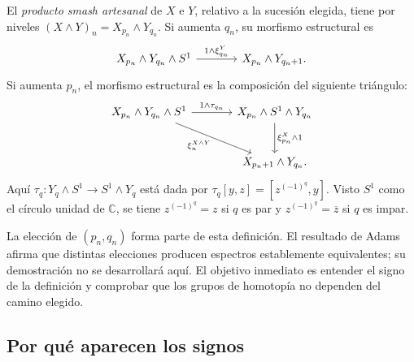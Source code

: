 \begin{defi}\label{defi:c10-smash-artesanal}
El \emph{producto smash artesanal} de $X$ e $Y$, relativo a la sucesión elegida, tiene por niveles $(X\wedge Y)_n=X_{p_n}\wedge Y_{q_n}$. Si aumenta $q_n$, su morfismo estructural es
\[
\begin{tikzcd}[column sep=large]
X_{p_n}\wedge Y_{q_n}\wedge S^1
\arrow[r,"1\wedge\xi^Y_{q_n}"] & X_{p_n}\wedge Y_{q_n+1}.
\end{tikzcd}
\]
Si aumenta $p_n$, el morfismo estructural es la composición del siguiente triángulo:
\[
\begin{tikzcd}[column sep=large,row sep=large]
X_{p_n}\wedge Y_{q_n}\wedge S^1
\arrow[r,"1\wedge\tau_{q_n}"] \arrow[dr,swap,"\xi^{X\wedge Y}_n"]
& X_{p_n}\wedge S^1\wedge Y_{q_n}
\arrow[d,"\xi^X_{p_n}\wedge1"]\\
& X_{p_n+1}\wedge Y_{q_n}.
\end{tikzcd}
\]
Aquí $\tau_q\colon Y_q\wedge S^1\to S^1\wedge Y_q$ está dada por $\tau_q[y,z]=[z^{(-1)^q},y]$. Visto $S^1$ como el círculo unidad de $\mathbb C$, se tiene $z^{(-1)^q}=z$ si $q$ es par y $z^{(-1)^q}=\overline z$ si $q$ es impar.
\end{defi}

La elección de $(p_n,q_n)$ forma parte de esta definición. El resultado de Adams afirma que distintas elecciones producen espectros establemente equivalentes; su demostración no se desarrollará aquí. El objetivo inmediato es entender el signo de la definición y comprobar que los grupos de homotopía no dependen del camino elegido.

\subsection{Por qué aparecen los signos}

